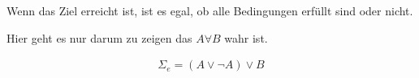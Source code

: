 Wenn das Ziel erreicht ist, ist es egal, ob alle Bedingungen erfüllt sind oder nicht.

Hier geht es nur darum zu zeigen das $A \forall B$ wahr ist.

\begin{eqnarray}
	\Sigma_{e} = \left(A \lor \lnot A \right) \lor B
\end{eqnarray}